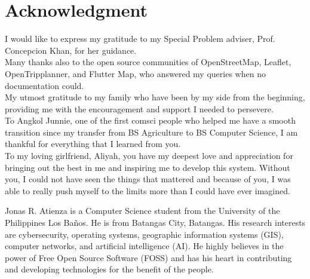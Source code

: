 \documentclass[journal]{./IEEE/IEEEtran}
\begin{document}
\section*{Acknowledgment}
I would like to express my gratitude to my Special Problem adviser, Prof. Concepcion Khan, for her guidance. \hfill \\
Many thanks also to the open source communities of OpenStreetMap, Leaflet, OpenTripplanner, and Flutter Map, who answered my queries when no documentation could. \hfill \\
My utmost gratitude to my family who have been by my side from the beginning, providing me with the encouragement and support I needed to persevere. \hfill \\
To Angkol Junnie, one of the first comsci people who helped me have a smooth transition since my transfer from BS Agriculture to BS Computer Science, I am thankful for everything that I learned from you. \hfill \\
To my loving girlfriend, Aliyah, you have my deepest love and appreciation for bringing out the best in me and inspiring me to develop this system. Without you, I could not have seen the things that mattered and because of you, I was able to really push myself to the limits more than I could have ever imagined.



\begin{biography}{Jonas R. Atienza}
    is a Computer Science student from the University of the Philippines Los Baños. He is from Batangas City, Batangas. His research interests are cybersecurity, operating systems, geographic information systems (GIS), computer networks, and artificial intelligence (AI).
He highly believes in the power of Free Open Source Software (FOSS) and has his heart in contributing and developing technologies for the benefit of the people.
\end{biography}
\end{document}
